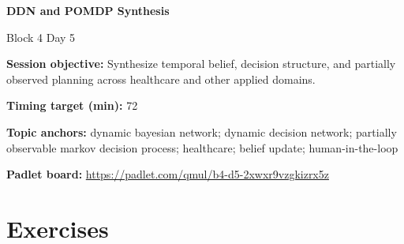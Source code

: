 \documentclass[11pt]{article}
\begin{document}
\begin{center}\LARGE\bfseries DDN and POMDP Synthesis\end{center}

\begin{center}\large Block 4 Day 5\end{center}

\begin{tcolorbox}[colback=MidnightBlue!4,colframe=MidnightBlue,title={Session Overview},fonttitle=\bfseries,breakable]
\textbf{Session objective:} Synthesize temporal belief, decision structure, and partially observed planning across healthcare and other applied domains.

\textbf{Timing target (min):} 72

\textbf{Topic anchors:} dynamic bayesian network; dynamic decision network; partially observable markov decision process; healthcare; belief update; human-in-the-loop

\textbf{Padlet board:} \url{https://padlet.com/qmul/b4-d5-2xwxr9vzgkizrx5z}
\end{tcolorbox}

\section*{Exercises}
\end{document}
